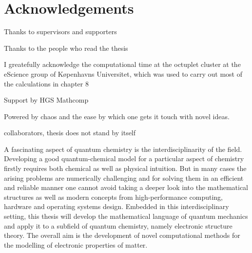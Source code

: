 \chapter*{Acknowledgements}

Thanks to supervisors and supporters

Thanks to the people who read the thesis


I greatefully acknowledge the computational time at the octuplet cluster at
the eScience group of Køpenhavns Universitet, which was used to carry out
most of the calculations in chapter 8

Support by HGS Mathcomp

Powered by chaos and the ease by which one gets it touch with novel ideas.

collaborators,
thesis does not stand by itself


A fascinating aspect of quantum chemistry is the interdisciplinarity of the field.
Developing a good quantum-chemical model for a particular aspect of chemistry
firstly requires both chemical as well as physical intuition.
But in many cases the arising problems are numerically challenging
and for solving them in an efficient and reliable manner
one cannot avoid taking a deeper look into the mathematical structures
as well as modern concepts from high-performance computing,
hardware and operating systems design.
Embedded in this interdisciplinary setting,
this thesis will develop the mathematical language of quantum mechanics
and apply it to a subfield of quantum chemistry,
namely electronic structure theory.
The overall aim is the development of novel computational methods
for the modelling of electronic properties of matter.


